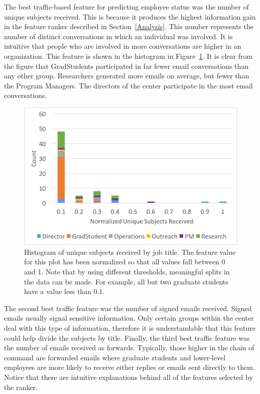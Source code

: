 \documentclass[10pt,twocolumn,conference]{IEEEtran}
\begin{document}
The best traffic-based feature for predicting employee status was the number of unique subjects received.  This is because it produces the highest information gain in the feature ranker described in Section~\ref{Analysis}.  This number represents the number of distinct conversations in which an individual was involved.  It is intuitive that people who are involved in more conversations are higher in an organization.  This feature is shown in the histogram in Figure~\ref{fig:traffic_ex_hist}.  It is clear from the figure that GradStudents participated in far fewer email conversations than any other group.  Researchers generated more emails on average, but fewer than the Program Managers.  The directors of the center participate in the most email conversations. 
\begin{figure}[t]
    \centering
        \includegraphics[width=\columnwidth,trim={1mm 5mm 1mm 2mm},clip]{Unique_subjects_rec_hist}
        \caption{Histogram of unique subjects received by job title.  The feature value for this plot has been normalized so that all values fall between 0 and 1.  Note that by using different thresholds, meaningful splits in the data can be made.  For example, all but two graduate students have a value less than $0.1$.}
        \label{fig:traffic_ex_hist}
\end{figure}

The second best traffic feature was the number of signed emails received.  Signed emails usually signal sensitive information.  Only certain groups within the center deal with this type of information, therefore it is understandable that this feature could help divide the subjects by title.  Finally, the third best traffic feature was the number of emails received as forwards.  Typically, those higher in the chain of command are forwarded emails where graduate students and lower-level employees are more likely to receive either replies or emails sent directly to them.  Notice that there are intuitive explanations behind all of the features selected by the ranker.
\end{document}
